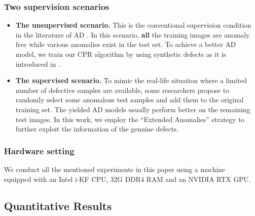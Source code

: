 \documentclass[lettersize,journal]{IEEEtran}
\begin{document}
\subsubsection{Two supervision scenarios}
\begin{itemize}
  \item
        \textbf{The unsupervised scenario.} This is the conventional supervision condition
        in the literature of AD \cite{Bergmann_2019_CVPR, Bergmann_2022, mishra2021vt}. In
        this scenario, \textbf{all} the training images are anomaly free while various
        anomalies exist in the test set. To achieve a better AD model, we train our CPR
        algorithm by using synthetic defects as it is introduced in .
  \item
        \textbf{The supervised scenario.} To mimic the real-life situation where a limited
        number of defective samples are available, some researchers \cite{ding2022catching,
          zhang2022prototypical} propose to randomly select some anomalous test samples and
        add them to the original training set. The yielded AD models usually perform better
        on the remaining test images. In this work, we employ the ``Extended Anomalies''
        strategy \cite{zhang2022prototypical} to further exploit the information of the
        genuine defects.
\end{itemize}

\subsubsection{Hardware setting}
We conduct all the mentioned experiments in this paper using a machine equipped with an
Intel i-KF CPU, 32G DDR4 RAM and an NVIDIA RTX  GPU.

\subsection{Quantitative Results}
\label{subsec:quantitative}
\end{document}
